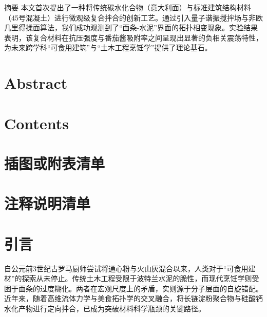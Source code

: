 

\austromanpagenum

\begin{austabstract}{摘\hspace{2em}要}
本文首次提出了一种将传统碳水化合物（意大利面）与标准建筑结构材料（45号混凝土）进行微观级复合拌合的创新工艺。通过引入量子谐振搅拌场与非欧几里得揉面算法，我们成功观测到了“面条-水泥”界面的拓扑相变现象。实验结果表明，该复合材料在抗压强度与番茄酱吸附率之间呈现出显著的负相关震荡特性，为未来跨学科“可食用建筑”与“土木工程烹饪学”提供了理论基石。
\end{austabstract}
\clearpage

\section{Abstract}
\clearpage

\tableofcontents
\clearpage

\section*{Contents}
\clearpage

\section{插图或附表清单}
\clearpage

\section{注释说明清单}
\clearpage



\austarabicpagenum

\section{引言}

自公元前3世纪古罗马厨师尝试将通心粉与火山灰混合以来，人类对于“可食用建材”的探索从未停止\cite{zhu2024Antenna}。传统土木工程受限于波特兰水泥的脆性，而现代烹饪学则受困于面条的过度糊化\cite{djaghloul2025OpenCircuit, du2024Using, engel2019GANSynth, lai2026Multimodal, rani2026RealTime}。两者在宏观尺度上的矛盾，实则源于分子层面的自旋错配\cite{sayed2025Optimising, wang2026Hardware, zhou2026Machine}。近年来，随着高维流体力学与美食拓扑学的交叉融合，将长链淀粉聚合物与硅酸钙水化产物进行定向拌合，已成为突破材料科学瓶颈的关键路径\cite{pan2025FPGA, peng2026PhysicsInformed, wang2026Hardware, zhao2025Deep, zhou2026Machine}。

